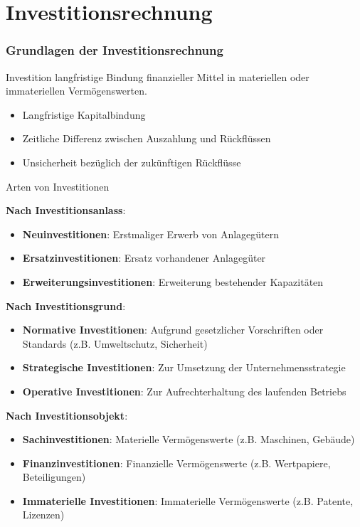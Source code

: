 \section{Investitionsrechnung}

\subsubsection{Grundlagen der Investitionsrechnung}

\begin{definition}{Investition}
    langfristige Bindung finanzieller Mittel in materiellen oder immateriellen Vermögenswerten.
\begin{itemize}
    \item Langfristige Kapitalbindung
    \item Zeitliche Differenz zwischen Auszahlung und Rückflüssen
    \item Unsicherheit bezüglich der zukünftigen Rückflüsse
\end{itemize}
\end{definition}

\begin{definition}{Arten von Investitionen}

    \textbf{Nach Investitionsanlass}:
    \begin{itemize}
        \item \textbf{Neuinvestitionen}: Erstmaliger Erwerb von Anlagegütern
        \item \textbf{Ersatzinvestitionen}: Ersatz vorhandener Anlagegüter
        \item \textbf{Erweiterungsinvestitionen}: Erweiterung bestehender Kapazitäten
    \end{itemize}
\textbf{Nach Investitionsgrund}:
    \begin{itemize}
        \item \textbf{Normative Investitionen}: Aufgrund gesetzlicher Vorschriften oder Standards (z.B. Umweltschutz, Sicherheit)
        \item \textbf{Strategische Investitionen}: Zur Umsetzung der Unternehmensstrategie
        \item \textbf{Operative Investitionen}: Zur Aufrechterhaltung des laufenden Betriebs
    \end{itemize}
\textbf{Nach Investitionsobjekt}:
    \begin{itemize}
        \item \textbf{Sachinvestitionen}: Materielle Vermögenswerte (z.B. Maschinen, Gebäude)
        \item \textbf{Finanzinvestitionen}: Finanzielle Vermögenswerte (z.B. Wertpapiere, Beteiligungen)
        \item \textbf{Immaterielle Investitionen}: Immaterielle Vermögenswerte (z.B. Patente, Lizenzen)
    \end{itemize}
\end{definition}

